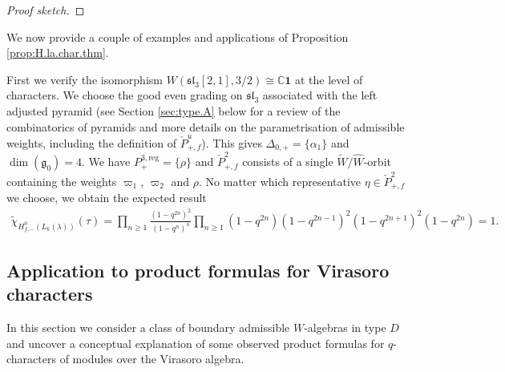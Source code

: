 \documentclass[12pt]{amsart}
\theoremstyle{plain}
\theoremstyle{definition}
\numberwithin{equation}{section}
\newcommand{\al}{\alpha}
\newcommand{\la}{\lambda}
\newcommand{\D}{\Delta}
\newcommand{\C}{\mathbb{C}}
\newcommand{\g}{\mathfrak{g}}
\newcommand{\sll}{\mathfrak{sl}}
\newcommand{\vac}{\mathbf{1}}
\newcommand{\wtil}[1]{\widetilde#1}
\newcommand{\what}[1]{\widehat#1}
\begin{document}
\begin{proof}[Proof sketch]
\end{proof}
We now provide a couple of examples and applications of Proposition \ref{prop:H.la.char.thm}.

First we verify the isomorphism $W(\sll_3[2, 1], 3/2) \cong \C \vac$ at the level of characters. We choose the good even grading on $\sll_3$ associated with the left adjusted pyramid (see Section \ref{sec:type.A} below for a review of the combinatorics of pyramids and more details on the parametrisation of admissible weights, including the definition of $\check{P}_{+, f}^u$). This gives $\D_{0, +} = \{\al_1\}$ and $\dim(\g_0) = 4$. We have $P_+^{3, \text{reg}} = \{\rho\}$ and $\check{P}_{+, f}^2$ consists of a single $\wtil{W}/\what{W}$-orbit containing the weights $\varpi_1$, $\varpi_2$ and $\rho$. No matter which representative $\eta \in \check{P}_{+, f}^2$ we choose, we obtain the expected result
\begin{align*}
\widetilde{\chi}_{H^0_{f, -}(L_k(\la))}(\tau) = \prod_{n \geq 1} \frac{(1-q^{2n})^2}{(1-q^n)^{4}} \prod_{n \geq 1} (1-q^{2n}) (1-q^{2n - 1})^2 (1-q^{2n + 1})^2 (1-q^{2n})
%
= 1.
\end{align*}

\subsection{Application to product formulas for Virasoro characters}\label{subsec:vir.prods}

In this section we consider a class of boundary admissible $W$-algebras in type $D$ and uncover a conceptual explanation of some observed product formulas for $q$-characters of modules over the Virasoro algebra.
\end{document}
